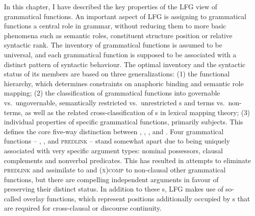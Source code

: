 \documentclass[output=paper]{../langscibook}
\begin{document}
 In this chapter, I have described the key properties of the LFG view of grammatical functions. An important aspect of LFG is assigning to grammatical functions a central role in grammar, without reducing them to more basic phenomena such as semantic roles, constituent structure position or relative syntactic rank. The inventory of grammatical functions is assumed to be universal, and each grammatical function is supposed to be associated with a distinct pattern of syntactic behaviour. The optimal inventory and the syntactic status of its members are based on three generalizations: (1) the functional hierarchy, which determines constraints on anaphoric binding and semantic role mapping; (2) the classification of grammatical functions into governable vs.\ ungovernable, semantically restricted vs.\ unrestricted {\GF}s and terms vs.\ non-terms, as well as the related cross-classification of {\GF}s in lexical mapping theory; (3) individual properties of specific grammatical functions, primarily subjects. This defines the core five-way distinction between \SUBJ, \OBJ, {\OBJTHETA}, {\OBLTHETA} and \ADJ. Four grammatical functions -- \POSS, \COMP, \XCOMP and \textsc{predlink} -- stand somewhat apart due to being uniquely associated with very specific argument types: nominal possessors, clausal complements and nonverbal predicates. This has resulted in attempts to eliminate \textsc{predlink} and assimilate \POSS to \SUBJ and \textsc{(x)comp} to non-clausal other grammatical functions, but there are compelling independent arguments in favour of preserving their distinct status. In addition to these {\GF}s, LFG makes use of so-called overlay functions, which represent positions additionally occupied by {\GF}s that are required for cross-clausal or discourse continuity.
 
\end{document}
